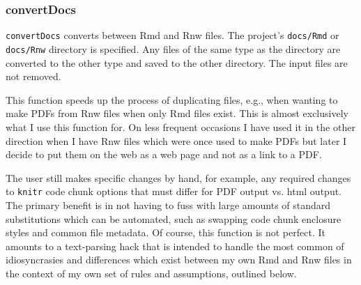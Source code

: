 \documentclass{article}\usepackage[]{graphicx}\usepackage[]{color}
\begin{document}
\subsubsection{convertDocs}
\texttt{convertDocs} converts between Rmd and Rnw files.
The project's \texttt{docs/Rmd} or \texttt{docs/Rnw} directory is specified.
Any files of the same type as the directory are converted to the other type and saved to the other directory.
The input files are not removed.

This function speeds up the process of duplicating files, e.g., when wanting to make PDFs from Rnw files when only Rmd files exist.
This is almost exclusively what I use this function for.
On less frequent occasions I have used it in the other direction when I have Rnw files which were once used to make PDFs but later I decide to put them on the web as a web page and not as a link to a PDF.

The user still makes specific changes by hand, for example, any required changes to \texttt{knitr} code chunk options that must differ for PDF output vs. html output.
The primary benefit is in not having to fuss with large amounts of standard substitutions which can be automated, such as swapping code chunk enclosure styles and common file metadata.
Of course, this function is not perfect.
It amounts to a text-parsing hack that is intended to handle the most common of idiosyncrasies and differences which exist between my own Rmd and Rnw files in the context of my own set of rules and assumptions, outlined below.
\end{document}

